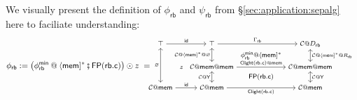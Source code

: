 \documentclass[acmsmall,screen,review,anonymous,nonacm]{acmart}
\newcommand{\kw}[1]{\ensuremath{ \mathsf{#1} }}
\newcommand{\vcomp}{\fatsemi}
\begin{document}
We visually present
the definition of
$\phi_\kw{rb}$
and
$\psi_\kw{rb}$
from \S\ref{sec:application:sepalg}
here to faciliate understanding:
\[
  \phi_\kw{rb} :=
  \big(
    \phi_\kw{rb}^\kw{min} \mathbin@ \langle \kw{mem} ]^*
    \vcomp
    \kw{FP}(\kw{rb.c})
    \big) \odot z
  \; = \hspace{-3ex}
  {\footnotesize
  \begin{array}{c}
    \begin{tikzcd}[row sep=0ex, column sep=0.5ex]
      \top \ar[rr, "\kw{id}"]
      \ar[dddd, leftrightarrow, "\varnothing"'] &&
      \top \ar[dd, leftrightarrow,
      "\mathcal{C}@ \langle \kw{mem} {]}^* @\varnothing"']
      \ar[rr, "\Gamma_\kw{rb}"] &&
      \mathcal{C}@ D_\kw{rb}
      \ar[dd, leftrightarrow,
      "\mathcal{C}@ \langle \kw{mem} {]}^* @ R_\kw{rb}"] \\
      &&& \phi_\kw{rb}^\kw{min} @ \langle \kw{mem} ]^* & \\
      & \mathit{z} &
      \mathcal{C} @ \kw{mem} @ \kw{mem}
      \ar[rr, "\kw{Clight}(\kw{rb.c}) @ \kw{mem}"]
      \ar[dd, leftrightarrow, "\mathcal{C}@\kw{Y}"']  &&
      \mathcal{C} @ \kw{mem} @ \kw{mem}
      \ar[dd, leftrightarrow, "\mathcal{C}@\kw{Y}"] \\
      &&& \kw{FP}(\kw{rb.c}) & \\
      \mathcal{C}@\kw{mem}\ar[rr, "\kw{id}"] &&
      \mathcal{C} @\kw{mem} \ar[rr, "\kw{Clight}(\kw{rb.c})"']
      && \mathcal{C} @\kw{mem}
    \end{tikzcd}
  \end{array}}
\]
\end{document}
